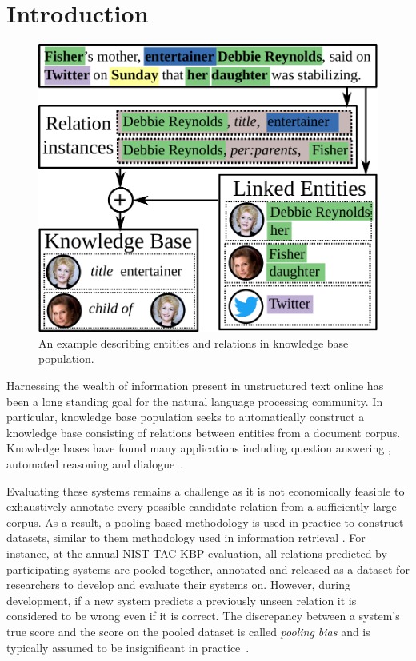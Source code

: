 \section{Introduction}
\label{sec:kbpo:intro}

\begin{figure}[t]
  \centering
  \includegraphics[width=0.6\columnwidth]{figures/entities-example.pdf}
  \caption[Example: KBP]{\label{fig:kbpo:example} An example describing entities and relations in knowledge base population.}
\end{figure}

Harnessing the wealth of information present in unstructured text online has been a long standing goal for the natural language processing community.
In particular, knowledge base population seeks to automatically construct a knowledge base consisting of relations between entities from a document corpus. %
Knowledge bases have found many applications including question answering \citep{berant2013freebase, fader2014open,reddy2014large}, automated reasoning \citep{kalyanpur2012structured} and dialogue~\citep{han2015exploiting}.

Evaluating these systems remains a challenge as it is not economically feasible to exhaustively annotate every possible candidate relation from a sufficiently large corpus.
As a result, a pooling-based methodology is used in practice to construct datasets, similar to them methodology used in information retrieval \citep{sparck1975report, harman1993trec}.
For instance, at the annual NIST TAC KBP evaluation, all relations predicted by participating systems are pooled together, annotated and released as a dataset for researchers to develop and evaluate their systems on.
However, during development, if a new system predicts a previously unseen relation it is considered to be wrong even if it is correct.
The discrepancy between a system's true score and the score on the pooled dataset is called \emph{pooling bias} and is typically assumed to be insignificant in practice~\citep{zobel1998reliable}.

